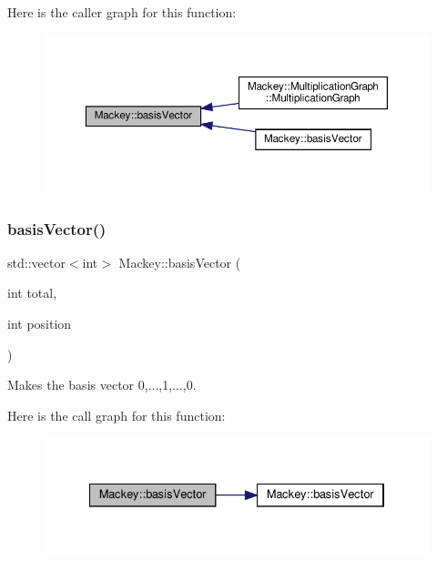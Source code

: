 Here is the caller graph for this function\+:\nopagebreak
\begin{figure}[H]
\begin{center}
\leavevmode
\includegraphics[width=350pt]{namespaceMackey_a86cc6cbaa708580f4e382b066bd0b7d4_icgraph}
\end{center}
\end{figure}
\mbox{\label{namespaceMackey_ae3454eb9b2574a835a29e3f58cfc6ead}} 
\subsubsection{\texorpdfstring{basis\+Vector()}{basisVector()}\hspace{0.1cm}{\footnotesize\ttfamily [2/2]}}
{\footnotesize\ttfamily std\+::vector$<$int$>$ Mackey\+::basis\+Vector (\begin{DoxyParamCaption}\item[{int}]{total,  }\item[{int}]{position }\end{DoxyParamCaption})\hspace{0.3cm}{\ttfamily [inline]}}



Makes the basis vector 0,...,1,...,0. 

Here is the call graph for this function\+:\nopagebreak
\begin{figure}[H]
\begin{center}
\leavevmode
\includegraphics[width=334pt]{namespaceMackey_ae3454eb9b2574a835a29e3f58cfc6ead_cgraph}
\end{center}
\end{figure}
\mbox{\label{namespaceMackey_a6d2d912037da84c6884ac62db997cc0f}} 
